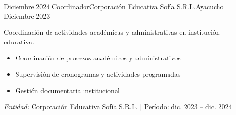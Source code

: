 \experience
{Diciembre 2024} {Coordinador}{Corporación Educativa Sofía S.R.L.}{Ayacucho}
{Diciembre 2023} {
	Coordinación de actividades académicas y administrativas en institución educativa.
	\begin{itemize}
		\item Coordinación de procesos académicos y administrativos
		\item Supervisión de cronogramas y actividades programadas
		\item Gestión documentaria institucional
	\end{itemize}
}
{\footnotesize{\emph{Entidad:} Corporación Educativa Sofía S.R.L. | Período: dic. 2023 -- dic. 2024}}
